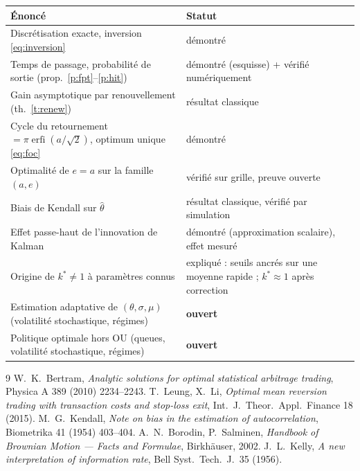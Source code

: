 \documentclass[11pt,a4paper]{article}
\theoremstyle{definition}
\theoremstyle{remark}
\DeclareMathOperator{\erfi}{erfi}
\begin{document}
\begin{center}
\begin{tabular}{p{}p{}}
\toprule
Énoncé & Statut\\
\midrule
Discrétisation exacte, inversion \eqref{eq:inversion} & démontré\\
Temps de passage, probabilité de sortie (prop.\ \ref{p:fpt}--\ref{p:hit}) & démontré (esquisse) + vérifié numériquement\\
Gain asymptotique par renouvellement (th.\ \ref{t:renew}) & résultat classique\\
Cycle du retournement $=\pi\erfi(a/\sqrt2)$, optimum unique \eqref{eq:foc} & démontré\\
Optimalité de $e=a$ sur la famille $(a,e)$ & vérifié sur grille, preuve ouverte\\
Biais de Kendall sur $\hat\theta$ & résultat classique, vérifié par simulation\\
Effet passe-haut de l'innovation de Kalman & démontré (approximation scalaire), effet mesuré\\
Origine de $k^*\neq1$ à paramètres connus & expliqué : seuils ancrés sur une moyenne rapide ; $k^*\approx1$ après correction\\
Estimation adaptative de $(\theta,\sigma,\mu)$ (volatilité stochastique, régimes) & \textbf{ouvert}\\
Politique optimale hors OU (queues, volatilité stochastique, régimes) & \textbf{ouvert}\\
\bottomrule
\end{tabular}
\end{center}

\begin{thebibliography}{9}
 W.\ K.\ Bertram, \emph{Analytic solutions for optimal statistical arbitrage trading}, Physica A 389 (2010) 2234--2243.
 T.\ Leung, X.\ Li, \emph{Optimal mean reversion trading with transaction costs and stop-loss exit}, Int.\ J.\ Theor.\ Appl.\ Finance 18 (2015).
 M.\ G.\ Kendall, \emph{Note on bias in the estimation of autocorrelation}, Biometrika 41 (1954) 403--404.
 A.\ N.\ Borodin, P.\ Salminen, \emph{Handbook of Brownian Motion --- Facts and Formulae}, Birkhäuser, 2002.
 J.\ L.\ Kelly, \emph{A new interpretation of information rate}, Bell Syst.\ Tech.\ J.\ 35 (1956).
\end{thebibliography}
\end{document}
